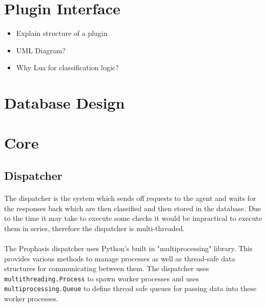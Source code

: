 \documentclass[bsc,logo,twoside]{infthesis}
\begin{document}
\section{Plugin Interface}
\begin{itemize}
	\item Explain structure of a plugin
	\item UML Diagram?
	\item Why Lua for classification logic?
\end{itemize}

\section{Database Design}

\section{Core}
\subsection{Dispatcher}
\paragraph*{}
	The dispatcher is the system which sends off requests to the agent and waits
	for the responses back which are then classified and then stored in the
	database.  Due to the time it may take to execute some checks it would be
	impractical to execute them in series, therefore the dispatcher is
	multi-threaded.

\paragraph*{}
	The Prophasis dispatcher uses Python's built in "multiprocessing" library. This
	provides various methods to manage processes as well as thread-safe data
	structures for communicating between them.  The dispatcher uses
	\texttt{multithreading.Process} to spawn worker processes and uses
	\texttt{multiprocessing.Queue} to define thread safe queues for passing data
	into these worker processes.
\end{document}
